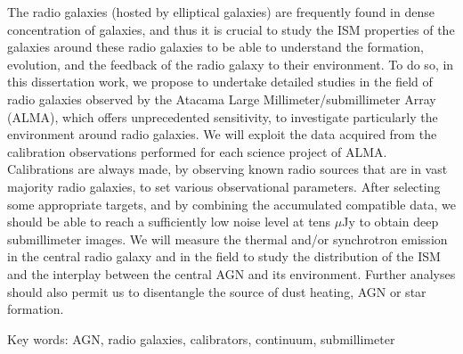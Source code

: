 The radio galaxies (hosted by elliptical galaxies) are frequently found in dense concentration of galaxies, and thus it is crucial to study the ISM properties of the galaxies around these radio galaxies to be able to understand the formation, evolution, and the feedback of the radio galaxy to their environment. To do so, in this dissertation work, we propose to undertake detailed studies in the field of radio galaxies observed by the Atacama Large Millimeter/submillimeter Array (ALMA), which offers unprecedented sensitivity, to investigate particularly the environment around radio galaxies. We will exploit the data acquired from the calibration observations performed for each science project of ALMA. Calibrations are always made, by observing known radio sources that are in vast majority radio galaxies, to set various observational parameters. After selecting some appropriate targets, and by combining the accumulated compatible data, we should be able to reach a sufficiently low noise level at tens $\mu$Jy to obtain deep submillimeter images. We will measure the thermal and/or synchrotron emission in the central radio galaxy and in the field to study the distribution of the ISM and the interplay between the central AGN and its environment. Further analyses should also permit us to disentangle the source of dust heating, AGN or star formation.

\vspace{1em}

\noindent Key words: AGN, radio galaxies, calibrators, continuum, submillimeter

\resetparskip



